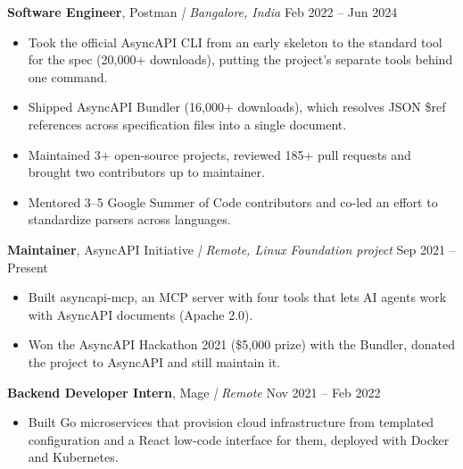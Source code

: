 \documentclass[10pt,a4paper]{article}
\newcommand{\role}[4]{%
  \textbf{#1}, #2 {\small\itshape | #3} \hfill #4\par\vspace{1pt}}
\begin{document}
\role{Software Engineer}{Postman}{Bangalore, India}{Feb 2022 -- Jun 2024}
\begin{itemize}
  \item Took the official AsyncAPI CLI from an early skeleton to the standard tool for the spec (20,000+ downloads), putting the project's separate tools behind one command.
  \item Shipped AsyncAPI Bundler (16,000+ downloads), which resolves JSON \$ref references across specification files into a single document.
  \item Maintained 3+ open-source projects, reviewed 185+ pull requests and brought two contributors up to maintainer.
  \item Mentored 3--5 Google Summer of Code contributors and co-led an effort to standardize parsers across languages.
\end{itemize}

\role{Maintainer}{AsyncAPI Initiative}{Remote, Linux Foundation project}{Sep 2021 -- Present}
\begin{itemize}
  \item Built asyncapi-mcp, an MCP server with four tools that lets AI agents work with AsyncAPI documents (Apache 2.0).
  \item Won the AsyncAPI Hackathon 2021 (\$5,000 prize) with the Bundler, donated the project to AsyncAPI and still maintain it.
\end{itemize}

\role{Backend Developer Intern}{Mage}{Remote}{Nov 2021 -- Feb 2022}
\begin{itemize}
  \item Built Go microservices that provision cloud infrastructure from templated configuration and a React low-code interface for them, deployed with Docker and Kubernetes.
\end{itemize}
\end{document}

